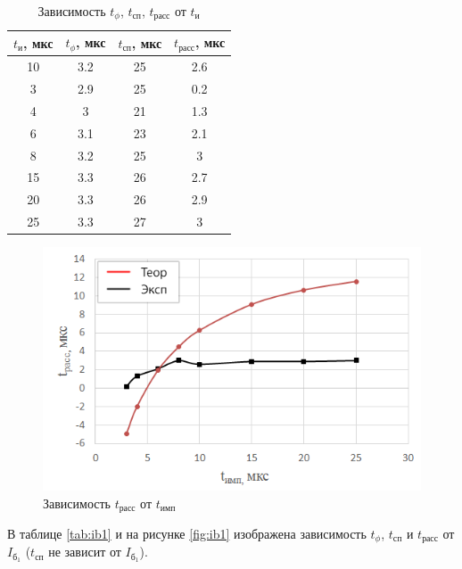 \begin{table}[H]
	\begin{center}
	\caption{Зависимость $t_\phi$, $t_\text{сп}$, $t_\text{расс}$ от $t_\text{и}$}
		\begin{tabular}{|c|c|c|c|}
		\hline 
		$t_\text{и}$, мкс & $t_\phi$, мкс & $t_\text{сп}$, мкс & $t_\text{расс}$, мкс \\ 
		\hline 
		10 & 3.2 & 25 & 2.6 \\ 
		\hline 
		3 & 2.9 & 25 & 0.2 \\ 
		\hline 
		4 & 3 & 21 & 1.3 \\ 
		\hline 
		6 & 3.1 & 23 & 2.1 \\ 
		\hline 
		8 & 3.2 & 25 & 3 \\ 
		\hline 
		15 & 3.3 & 26 & 2.7 \\ 
		\hline 
		20 & 3.3 & 26 & 2.9 \\ 
		\hline 
		25 & 3.3 & 27 & 3 \\ 
		\hline 
		\end{tabular} 
		\label{tab:timp}
		
	\end{center}
\end{table}
\vspace{-1.5cm}
\begin{figure}[H]
	\begin{center}
		\includegraphics[width=13cm]{img/trass_timp}
		\caption{Зависимость $t_\text{расс}$ от $t_\text{имп}$}
		\label{fig:timp}
	\end{center}
\end{figure}

В таблице \ref{tab:ib1} и на рисунке \ref{fig:ib1} изображена зависимость $t_\phi$, $t_\text{сп}$ и $t_\text{расс}$ от $I_{\text{б}_1}$ ($t_\text{сп}$ не зависит от $I_{\text{б}_1}$).

